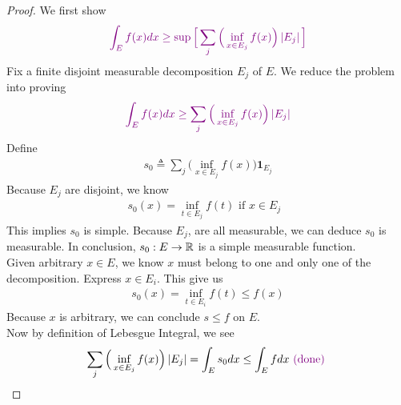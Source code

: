 \documentclass{report}
\begin{document}
\begin{proof}
We first show 
\begin{align*}
  \textcolor{violet}{\int_E f(x)dx \geq \sup \Big[ \sum_j \Big(\inf_{x \in E_j}f(x) \Big) \left|E_j\right|\Big]}
\end{align*}
Fix a finite disjoint measurable decomposition $E_j$ of $E$.  We reduce the problem into proving 
\begin{align*}
  \textcolor{violet}{\int_E f(x)dx \geq \sum_j \Big(\inf_{x \in E_j}f(x)\Big)\left|E_j\right|}
\end{align*}
Define 
\begin{align*}
s_0\triangleq \sum_j \Big(\inf_{x \in E_j}f(x) \Big)\textbf{1}_{E_j}
\end{align*}
Because $E_j$ are disjoint, we know 
 \begin{align*}
s_0(x)=\inf_{t \in E_j}f(t)\text{ if $x \in E_j$ }
\end{align*}
This implies $s_0$ is simple. Because $E_j$, are all measurable, we can deduce  $s_0$ is measurable. In conclusion, $s_0:E\rightarrow \mathbb{R}$ is a simple measurable function. \\

Given arbitrary $x \in E$, we know $x$ must belong to one and only one of the decomposition. Express $x\in E_i$. This give us 
\begin{align*}
s_0(x)=\inf_{t \in E_i}f(t) \leq f(x)
\end{align*}
Because $x$ is arbitrary, we can conclude  $s\leq f$ on $E$.\\

Now by definition of Lebesgue Integral, we see 
\begin{align*}
\sum_j \Big(\inf_{x \in E_j}f(x) \Big)\left|E_j\right|=\int_E s_0dx\leq \int_E fdx \textcolor{violet}{\text{ (done) }}
\end{align*}




\end{proof}
\end{document}
